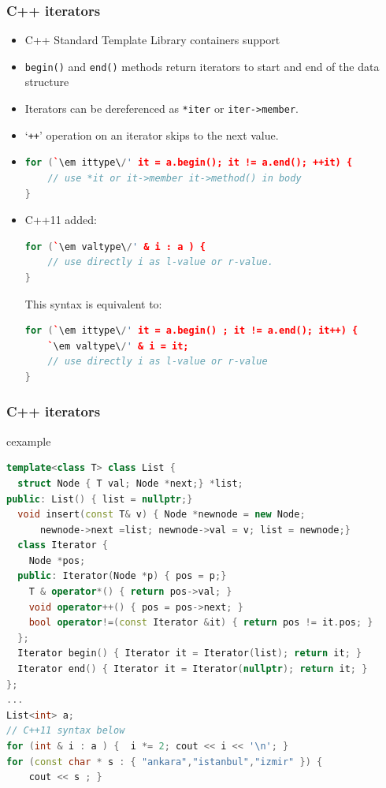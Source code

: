 \begin{frame}[fragile]
\frametitle{C++ iterators}
\begin{itemize}
\item C++ Standard Template Library containers support 
\item \lstinline!begin()! and \lstinline!end()! methods return iterators to start and end of the data structure
\item Iterators can be dereferenced as \lstinline!*iter! or \lstinline!iter->member!.
\item `\lstinline!++!' operation on an iterator skips to the next value.
\item \begin{lstlisting}[language=C++,escapeinside=`']
for (`\em ittype\/' it = a.begin(); it != a.end(); ++it) {
    // use *it or it->member it->method() in body
}
\end{lstlisting}
\item C++11 added:
\begin{lstlisting}[language=C++,escapeinside=`']
for (`\em valtype\/' & i : a ) {
    // use directly i as l-value or r-value. 
}
\end{lstlisting}
This syntax is equivalent to:
\begin{lstlisting}[language=C++,escapeinside=`']
for (`\em ittype\/' it = a.begin() ; it != a.end(); it++) {
    `\em valtype\/' & i = it;
    // use directly i as l-value or r-value 
}
\end{lstlisting}
\end{itemize}
\end{frame}

\begin{frame}[fragile]
\frametitle{C++ iterators}
\begin{beamercolorbox}{cexample}
\begin{lstlisting}[language=C++]
template<class T> class List {
  struct Node { T val; Node *next;} *list;
public: List() { list = nullptr;}
  void insert(const T& v) { Node *newnode = new Node;
      newnode->next =list; newnode->val = v; list = newnode;}
  class Iterator {
    Node *pos;
  public: Iterator(Node *p) { pos = p;}
    T & operator*() { return pos->val; }
    void operator++() { pos = pos->next; }
    bool operator!=(const Iterator &it) { return pos != it.pos; }
  };
  Iterator begin() { Iterator it = Iterator(list); return it; }
  Iterator end() { Iterator it = Iterator(nullptr); return it; }
};
...
List<int> a;
// C++11 syntax below
for (int & i : a ) {  i *= 2; cout << i << '\n'; }
for (const char * s : { "ankara","istanbul","izmir" }) { 
    cout << s ; }
\end{lstlisting}
\end{beamercolorbox}
\end{frame}


